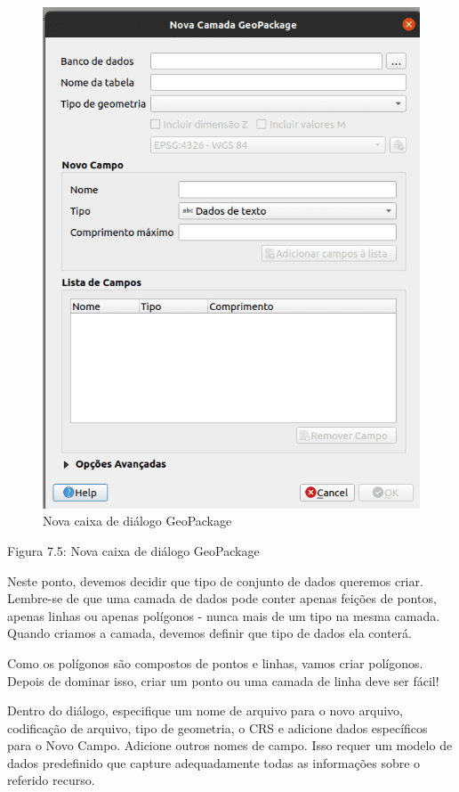 \documentclass[
]{krantz}
\begin{document}
\begin{figure}
\centering
\includegraphics{media/modulo7/new-vector.png}
\caption{Nova caixa de diálogo GeoPackage}
\end{figure}

Figura 7.5: Nova caixa de diálogo GeoPackage

Neste ponto, devemos decidir que tipo de conjunto de dados queremos criar. Lembre-se de que uma camada de dados pode conter apenas feições de pontos, apenas linhas ou apenas polígonos - nunca mais de um tipo na mesma camada. Quando criamos a camada, devemos definir que tipo de dados ela conterá.

Como os polígonos são compostos de pontos e linhas, vamos criar polígonos. Depois de dominar isso, criar um ponto ou uma camada de linha deve ser fácil!

Dentro do diálogo, especifique um nome de arquivo para o novo arquivo, codificação de arquivo, tipo de geometria, o CRS e adicione dados específicos para o Novo Campo. Adicione outros nomes de campo. Isso requer um modelo de dados predefinido que capture adequadamente todas as informações sobre o referido recurso.
\end{document}
